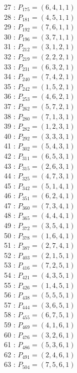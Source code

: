 \documentclass{article}
\begin{document}
{\begin{multicols}{3}
27 : $P_{175}=( 6, 4, 1, 1 )$\\
28 : $P_{181}=( 4, 5, 1, 1 )$\\
29 : $P_{192}=( 7, 6, 1, 1 )$\\
30 : $P_{196}=( 3, 7, 1, 1 )$\\
31 : $P_{212}=( 3, 1, 2, 1 )$\\
32 : $P_{219}=( 2, 2, 2, 1 )$\\
33 : $P_{231}=( 6, 3, 2, 1 )$\\
34 : $P_{240}=( 7, 4, 2, 1 )$\\
35 : $P_{242}=( 1, 5, 2, 1 )$\\
36 : $P_{253}=( 4, 6, 2, 1 )$\\
37 : $P_{262}=( 5, 7, 2, 1 )$\\
38 : $P_{280}=( 7, 1, 3, 1 )$\\
39 : $P_{282}=( 1, 2, 3, 1 )$\\
40 : $P_{292}=( 3, 3, 3, 1 )$\\
41 : $P_{302}=( 5, 4, 3, 1 )$\\
42 : $P_{311}=( 6, 5, 3, 1 )$\\
43 : $P_{315}=( 2, 6, 3, 1 )$\\
44 : $P_{325}=( 4, 7, 3, 1 )$\\
45 : $P_{342}=( 5, 1, 4, 1 )$\\
46 : $P_{351}=( 6, 2, 4, 1 )$\\
47 : $P_{360}=( 7, 3, 4, 1 )$\\
48 : $P_{365}=( 4, 4, 4, 1 )$\\
49 : $P_{372}=( 3, 5, 4, 1 )$\\
50 : $P_{378}=( 1, 6, 4, 1 )$\\
51 : $P_{387}=( 2, 7, 4, 1 )$\\
52 : $P_{403}=( 2, 1, 5, 1 )$\\
53 : $P_{416}=( 7, 2, 5, 1 )$\\
54 : $P_{421}=( 4, 3, 5, 1 )$\\
55 : $P_{426}=( 1, 4, 5, 1 )$\\
56 : $P_{438}=( 5, 5, 5, 1 )$\\
57 : $P_{444}=( 3, 6, 5, 1 )$\\
58 : $P_{455}=( 6, 7, 5, 1 )$\\
59 : $P_{469}=( 4, 1, 6, 1 )$\\
60 : $P_{476}=( 3, 2, 6, 1 )$\\
61 : $P_{486}=( 5, 3, 6, 1 )$\\
62 : $P_{491}=( 2, 4, 6, 1 )$\\
63 : $P_{504}=( 7, 5, 6, 1 )$\\

\end{multicols}}
\end{document}
